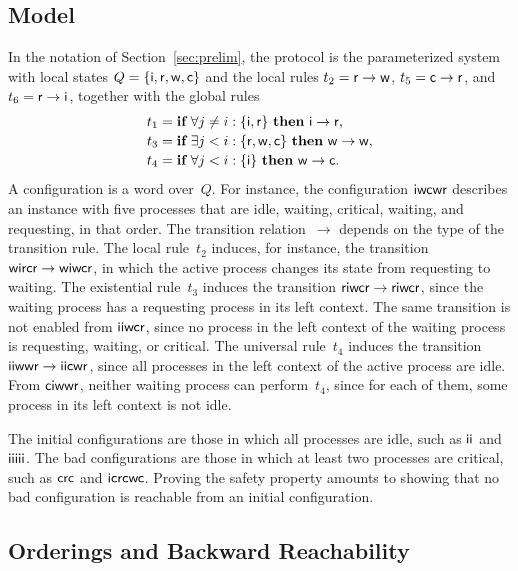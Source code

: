 \subsection{Model}
In the notation of Section~\ref{sec:prelim}, the protocol is the
parameterized system with local states $Q = \{\mathsf{i}, \mathsf{r}, \mathsf{w}, \mathsf{c}\}$
and the local rules $t_2 = \mathsf{r} \to \mathsf{w}$, $t_5 = \mathsf{c} \to \mathsf{r}$, and $t_6 =
\mathsf{r} \to \mathsf{i}$, together with the global rules
\[
\begin{array}{l}
t_1 = \textbf{if}\ \forall j \neq i : \{\Idle,\Req\}\ \textbf{then}\ \Idle \to \Req, \\[2pt]
t_3 = \textbf{if}\ \exists j < i : \{\Req,\Wait,\Crit\}\ \textbf{then}\ \Wait \to \Wait, \\[2pt]
t_4 = \textbf{if}\ \forall j < i : \{\Idle\}\ \textbf{then}\ \Wait \to \Crit .
\end{array}
\]
A configuration is a word over~$Q$. For instance, the configuration
$\mathsf{i}\mathsf{w}\mathsf{c}\mathsf{w}\mathsf{r}$ describes an instance with five processes that are
idle, waiting, critical, waiting, and requesting, in that order. The
transition relation~$\to$ depends on the type of the transition rule. The
local rule~$t_2$ induces, for instance, the transition
$\mathsf{w}\mathsf{i}\mathsf{r}\mathsf{c}\mathsf{r} \to \mathsf{w}\mathsf{i}\mathsf{w}\mathsf{c}\mathsf{r}$, in which the active
process changes its state from requesting to waiting. The existential
rule~$t_3$ induces the transition $\mathsf{r}\mathsf{i}\mathsf{w}\mathsf{c}\mathsf{r} \to
\mathsf{r}\mathsf{i}\mathsf{w}\mathsf{c}\mathsf{r}$, since the waiting process has a requesting process in
its left context. The same transition is not enabled from
$\mathsf{i}\mathsf{i}\mathsf{w}\mathsf{c}\mathsf{r}$, since no process in the left context of the
waiting process is requesting, waiting, or critical. The universal rule~$t_4$
induces the transition $\mathsf{i}\mathsf{i}\mathsf{w}\mathsf{w}\mathsf{r} \to \mathsf{i}\mathsf{i}\mathsf{c}\mathsf{w}\mathsf{r}$,
since all processes in the left context of the active process are idle. From
$\mathsf{c}\mathsf{i}\mathsf{w}\mathsf{w}\mathsf{r}$, neither waiting process can perform~$t_4$, since
for each of them, some process in its left context is not idle.

The initial configurations are those in which all processes are idle, such as
$\mathsf{i}\mathsf{i}$ and $\mathsf{i}\mathsf{i}\mathsf{i}\mathsf{i}\mathsf{i}$. The bad configurations are those
in which at least two processes are critical, such as $\mathsf{c}\mathsf{r}\mathsf{c}$ and
$\mathsf{i}\mathsf{c}\mathsf{r}\mathsf{c}\mathsf{w}\mathsf{c}$. Proving the safety property amounts to showing that no bad
configuration is reachable from an initial configuration.

\subsection{Orderings and Backward Reachability}
\label{sec:wqo}

